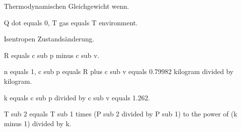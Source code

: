 Thermodynamischen Gleichgewicht wenn.

Q dot equals 0, T gas equals T environment.

Isentropen Zustandsänderung.

R equals c sub p minus c sub v.

n equals 1, c sub p equals R plus c sub v equals 0.79982 kilogram divided by kilogram.

k equals c sub p divided by c sub v equals 1.262.

T sub 2 equals T sub 1 times (P sub 2 divided by P sub 1) to the power of (k minus 1) divided by k.